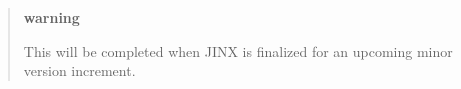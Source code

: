 \begin{quote}
{\bfseries warning}

This will be completed when J\+I\+NX is finalized for an upcoming minor version increment.\end{quote}
